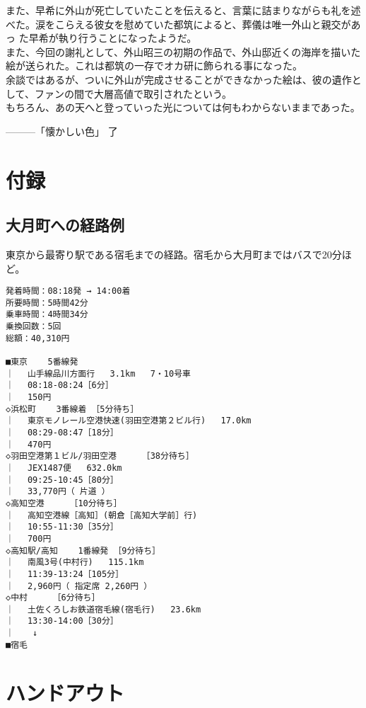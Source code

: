 \documentclass[a4paper,8pt,min]{jsarticle}
\begin{document}
また、早希に外山が死亡していたことを伝えると、言葉に詰まりながらも礼を述
べた。涙をこらえる彼女を慰めていた都筑によると、葬儀は唯一外山と親交があっ
た早希が執り行うことになったようだ。\\

また、今回の謝礼として、外山昭三の初期の作品で、外山邸近くの海岸を描いた
絵が送られた。これは都筑の一存でオカ研に飾られる事になった。\\

余談ではあるが、ついに外山が完成させることができなかった絵は、彼の遺作と
して、ファンの間で大層高値で取引されたという。\\

もちろん、あの天へと登っていった光については何もわからないままであった。
\\


\begin{flushright}
 ---------「懐かしい色」 了
\end{flushright}

\newpage
\section{付録}
\subsection{大月町への経路例}
東京から最寄り駅である宿毛までの経路。宿毛から大月町まではバスで20分ほど。
\begin{screen}
\begin{verbatim}
発着時間：08:18発 → 14:00着
所要時間：5時間42分
乗車時間：4時間34分
乗換回数：5回
総額：40,310円

■東京    5番線発
｜ 　山手線品川方面行   3.1km   7・10号車
｜ 　08:18-08:24［6分］
｜ 　150円
◇浜松町    3番線着 ［5分待ち］
｜ 　東京モノレール空港快速(羽田空港第２ビル行)   17.0km   
｜ 　08:29-08:47［18分］
｜ 　470円
◇羽田空港第１ビル/羽田空港     ［38分待ち］
｜ 　JEX1487便   632.0km   
｜ 　09:25-10:45［80分］
｜ 　33,770円（ 片道 ）
◇高知空港     ［10分待ち］
｜ 　高知空港線［高知］(朝倉［高知大学前］行)      
｜ 　10:55-11:30［35分］
｜ 　700円
◇高知駅/高知    1番線発 ［9分待ち］
｜ 　南風3号(中村行)   115.1km   
｜ 　11:39-13:24［105分］
｜ 　2,960円（ 指定席 2,260円 ）
◇中村     ［6分待ち］
｜ 　土佐くろしお鉄道宿毛線(宿毛行)   23.6km   
｜ 　13:30-14:00［30分］
｜ 　 ↓ 
■宿毛
\end{verbatim}
\end{screen}
\newpage

\section{ハンドアウト}
\end{document}
